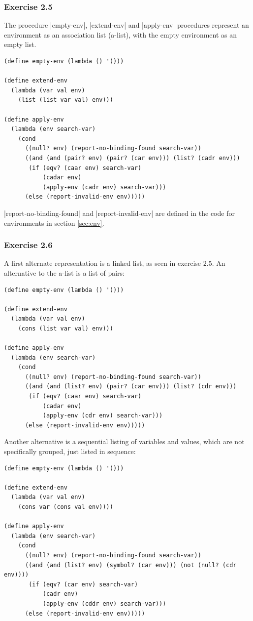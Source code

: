 \documentclass[a4paper]{article}
\begin{document}
\subsubsection{Exercise 2.5}

The procedure |empty-env|, |extend-env| and |apply-env| procedures represent an environment as an association list (a-list), with the empty environment as an empty list.

\begin{lstlisting}
(define empty-env (lambda () '()))

(define extend-env
  (lambda (var val env)
    (list (list var val) env)))

(define apply-env
  (lambda (env search-var)
    (cond
      ((null? env) (report-no-binding-found search-var))
      ((and (and (pair? env) (pair? (car env))) (list? (cadr env)))
       (if (eqv? (caar env) search-var)
           (cadar env)
           (apply-env (cadr env) search-var)))
      (else (report-invalid-env env)))))
\end{lstlisting}

|report-no-binding-found| and |report-invalid-env| are defined in the code for environments in section \ref{sec:env}.

\subsubsection{Exercise 2.6}

A first alternate representation is a linked list, as seen in exercise 2.5. An alternative to the a-list is a list of pairs:

\begin{lstlisting}
(define empty-env (lambda () '()))

(define extend-env
  (lambda (var val env)
    (cons (list var val) env)))

(define apply-env
  (lambda (env search-var)
    (cond
      ((null? env) (report-no-binding-found search-var))
      ((and (and (list? env) (pair? (car env))) (list? (cdr env)))
       (if (eqv? (caar env) search-var)
           (cadar env)
           (apply-env (cdr env) search-var)))
      (else (report-invalid-env env)))))
\end{lstlisting}

Another alternative is a sequential listing of variables and values, which are not specifically grouped, just listed in sequence:

\begin{lstlisting}
(define empty-env (lambda () '()))

(define extend-env
  (lambda (var val env)
    (cons var (cons val env))))

(define apply-env
  (lambda (env search-var)
    (cond
      ((null? env) (report-no-binding-found search-var))
      ((and (and (list? env) (symbol? (car env))) (not (null? (cdr env))))
       (if (eqv? (car env) search-var)
           (cadr env)
           (apply-env (cddr env) search-var)))
      (else (report-invalid-env env)))))
\end{lstlisting}
\end{document}
